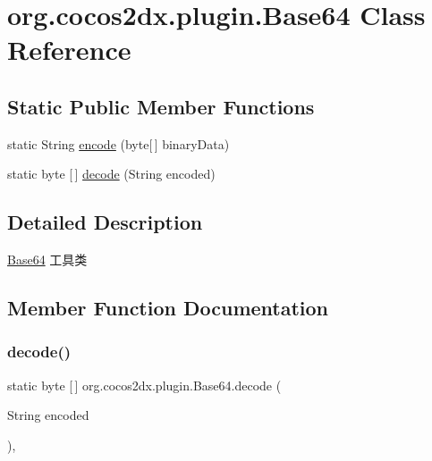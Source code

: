 \hypertarget{classorg_1_1cocos2dx_1_1plugin_1_1Base64}{}\section{org.\+cocos2dx.\+plugin.\+Base64 Class Reference}
\label{classorg_1_1cocos2dx_1_1plugin_1_1Base64}
\subsection*{Static Public Member Functions}
\begin{DoxyCompactItemize}
\item 
static String \hyperlink{classorg_1_1cocos2dx_1_1plugin_1_1Base64_a37d7b87107c8210e41b4f31243e8c39a}{encode} (byte\mbox{[}$\,$\mbox{]} binary\+Data)
\item 
static byte \mbox{[}$\,$\mbox{]} \hyperlink{classorg_1_1cocos2dx_1_1plugin_1_1Base64_ab8f76a7970610d0d44b2725e35164d4d}{decode} (String encoded)
\end{DoxyCompactItemize}


\subsection{Detailed Description}
\hyperlink{classorg_1_1cocos2dx_1_1plugin_1_1Base64}{Base64} 工具类 

\subsection{Member Function Documentation}
\mbox{\label{classorg_1_1cocos2dx_1_1plugin_1_1Base64_ab8f76a7970610d0d44b2725e35164d4d}} 
\subsubsection{\texorpdfstring{decode()}{decode()}}
{\footnotesize\ttfamily static byte \mbox{[}$\,$\mbox{]} org.\+cocos2dx.\+plugin.\+Base64.\+decode (\begin{DoxyParamCaption}\item[{String}]{encoded }\end{DoxyParamCaption})\hspace{0.3cm}{\ttfamily [inline]}, {\ttfamily [static]}}

